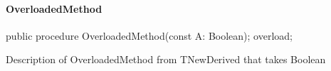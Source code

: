 \documentclass{report}
\newif\ifpdf
\begin{document}
\paragraph*{OverloadedMethod}\hspace*{\fill}

\label{ok_inherited_members_hide_ancestor.TNewDerived-OverloadedMethod}
\begin{list}{}{
\setlength{\itemindent}{0cm}
\setlength{\listparindent}{0cm}
\setlength{\leftmargin}{\evensidemargin}
\addtolength{\leftmargin}{\tmplength}
\settowidth{\labelsep}{X}
\addtolength{\leftmargin}{\labelsep}
\setlength{\labelwidth}{\tmplength}
}
\item[\textbf{Declaration}\hfill]
\ifpdf
\begin{flushleft}
\fi
\begin{ttfamily}
public procedure OverloadedMethod(const A: Boolean); overload;\end{ttfamily}

\ifpdf
\end{flushleft}
\fi

\par
\item[\textbf{Description}]
Description of OverloadedMethod from TNewDerived that takes Boolean

\end{list}
\end{document}
